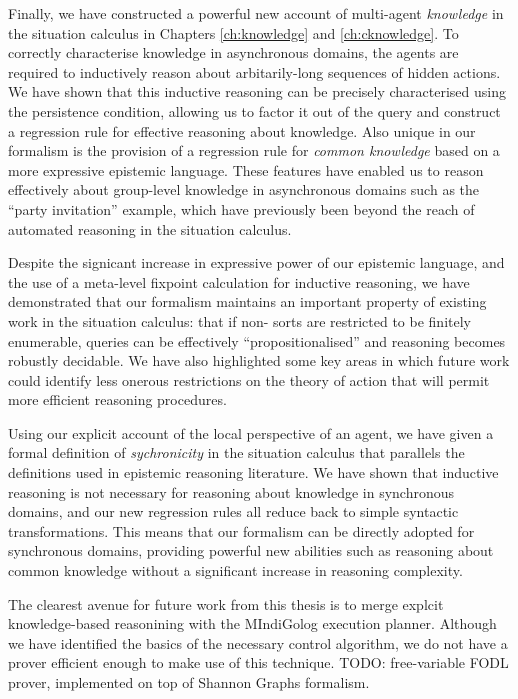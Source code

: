 Finally, we have constructed a powerful new account of multi-agent
\emph{knowledge} in the situation calculus in Chapters \ref{ch:knowledge}
and \ref{ch:cknowledge}. To correctly characterise knowledge in asynchronous
domains, the agents are required to inductively reason about arbitarily-long
sequences of hidden actions. We have shown that this inductive reasoning
can be precisely characterised using the persistence condition, allowing
us to factor it out of the query and construct a regression rule for
effective reasoning about knowledge. Also unique in our formalism
is the provision of a regression rule for \emph{common knowledge}
based on a more expressive epistemic language. These features have
enabled us to reason effectively about group-level knowledge in asynchronous
domains such as the {}``party invitation'' example, which have previously
been beyond the reach of automated reasoning in the situation calculus.

Despite the signicant increase in expressive power of our epistemic
language, and the use of a meta-level fixpoint calculation for inductive
reasoning, we have demonstrated that our formalism maintains an important
property of existing work in the situation calculus: that if non-
sorts are restricted to be finitely enumerable, queries can be effectively
{}``propositionalised'' and reasoning becomes robustly decidable.
We have also highlighted some key areas in which future work could
identify less onerous restrictions on the theory of action that will
permit more efficient reasoning procedures.

Using our explicit account of the local perspective of an agent, we
have given a formal definition of \emph{sychronicity} in the situation
calculus that parallels the definitions used in epistemic reasoning
literature. We have shown that inductive reasoning is not necessary
for reasoning about knowledge in synchronous domains, and our new
regression rules all reduce back to simple syntactic transformations.
This means that our formalism can be directly adopted for synchronous
domains, providing powerful new abilities such as reasoning about
common knowledge without a significant increase in reasoning complexity.

The clearest avenue for future work from this thesis is to merge explcit
knowledge-based reasonining with the MIndiGolog execution planner.
Although we have identified the basics of the necessary control algorithm,
we do not have a prover efficient enough to make use of this technique.
TODO: free-variable FODL prover, implemented on top of Shannon Graphs
formalism.

